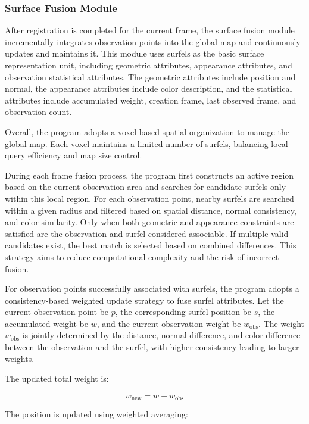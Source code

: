 \documentclass[12pt]{interim_report}
\begin{document}
\subsubsection{Surface Fusion Module}

After registration is completed for the current frame, the surface fusion module incrementally integrates observation points into the global map and continuously updates and maintains it. This module uses surfels as the basic surface representation unit, including geometric attributes, appearance attributes, and observation statistical attributes. The geometric attributes include position and normal, the appearance attributes include color description, and the statistical attributes include accumulated weight, creation frame, last observed frame, and observation count.

Overall, the program adopts a voxel-based spatial organization to manage the global map. Each voxel maintains a limited number of surfels, balancing local query efficiency and map size control.

During each frame fusion process, the program first constructs an active region based on the current observation area and searches for candidate surfels only within this local region. For each observation point, nearby surfels are searched within a given radius and filtered based on spatial distance, normal consistency, and color similarity. Only when both geometric and appearance constraints are satisfied are the observation and surfel considered associable. If multiple valid candidates exist, the best match is selected based on combined differences. This strategy aims to reduce computational complexity and the risk of incorrect fusion.

For observation points successfully associated with surfels, the program adopts a consistency-based weighted update strategy to fuse surfel attributes. Let the current observation point be $p$, the corresponding surfel position be $s$, the accumulated weight be $w$, and the current observation weight be $w_{\text{obs}}$. The weight $w_{\text{obs}}$ is jointly determined by the distance, normal difference, and color difference between the observation and the surfel, with higher consistency leading to larger weights.

The updated total weight is:

\begin{equation}
w_{\text{new}} = w + w_{\text{obs}}
\end{equation}

The position is updated using weighted averaging:
\end{document}
